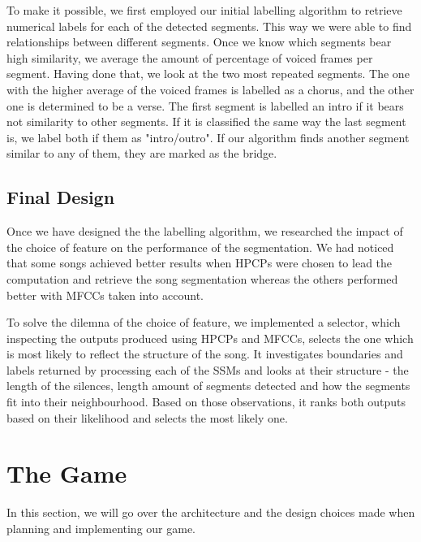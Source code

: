 To make it possible, we first employed our initial labelling algorithm to retrieve numerical labels for each of the detected segments. This way we were able to find relationships between different segments. Once we know which segments bear high similarity, we average the amount of percentage of voiced frames per segment. Having done that, we look at the two most repeated segments. The one with the higher average of the voiced frames is labelled as a chorus, and the other one is determined to be a verse. The first segment is labelled an intro if it bears not similarity to other segments. If it is classified the same way the last segment is, we label both if them as "intro/outro". If our algorithm finds another segment similar to any of them, they are marked as the bridge.

\vspace{10pt}


\subsection{Final Design}

Once we have designed the the labelling algorithm, we researched the impact of the choice of feature on the performance of the segmentation. We had noticed that some songs achieved better results when HPCPs were chosen to lead the computation and retrieve the song segmentation whereas the others performed better with MFCCs taken into account. 

To solve the dilemna of the choice of feature, we implemented a selector, which inspecting the outputs produced using HPCPs and MFCCs, selects the one which is most likely to reflect the structure of the song. It investigates boundaries and labels returned by processing each of the SSMs and looks at their structure - the length of the silences, length amount of segments detected and how the segments fit into their neighbourhood. Based on those observations, it ranks both outputs based on their likelihood and selects the most likely one. 





\vspace{20pt}




\section{The Game}

In this section, we will go over the architecture and the design choices made when planning and implementing our game.

